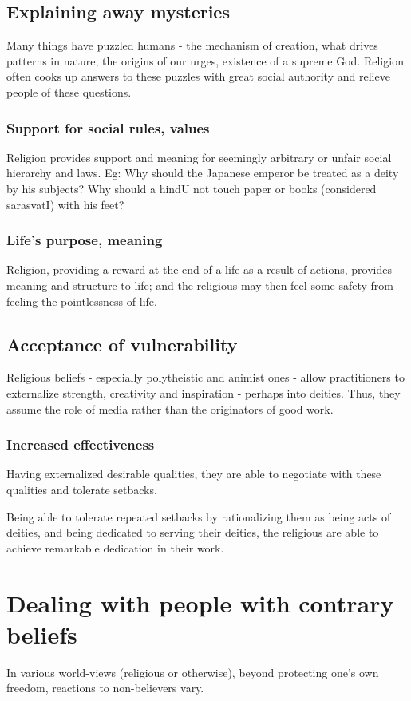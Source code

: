 \documentclass[oneside, article]{memoir}
\begin{document}
\subsection{Explaining away mysteries}
Many things have puzzled humans - the mechanism of creation, what drives patterns in nature, the origins of our urges, existence of a supreme God. Religion often cooks up answers to these puzzles with great social authority and relieve people of these questions.

\subsubsection{Support for social rules, values}
Religion provides support and meaning for seemingly arbitrary or unfair social hierarchy and laws. Eg: Why should the Japanese emperor be treated as a deity by his subjects? Why should a hindU not touch paper or books (considered sarasvatI) with his feet?

\subsubsection{Life's purpose, meaning}
Religion, providing a reward at the end of a life as a result of actions, provides meaning and structure to life; and the religious may then feel some safety from feeling the pointlessness of life.

\subsection{Acceptance of vulnerability}
Religious beliefs - especially polytheistic and animist ones - allow practitioners to externalize strength, creativity and inspiration - perhaps into deities. Thus, they assume the role of media rather than the originators of good work.

\subsubsection{Increased effectiveness}
Having externalized desirable qualities, they are able to negotiate with these qualities and tolerate setbacks.

Being able to tolerate repeated setbacks by rationalizing them as being acts of deities, and being dedicated to serving their deities, the religious are able to achieve remarkable dedication in their work.

\section{Dealing with people with contrary beliefs}
In various world-views (religious or otherwise), beyond protecting one's own freedom, reactions to non-believers vary.
\end{document}

